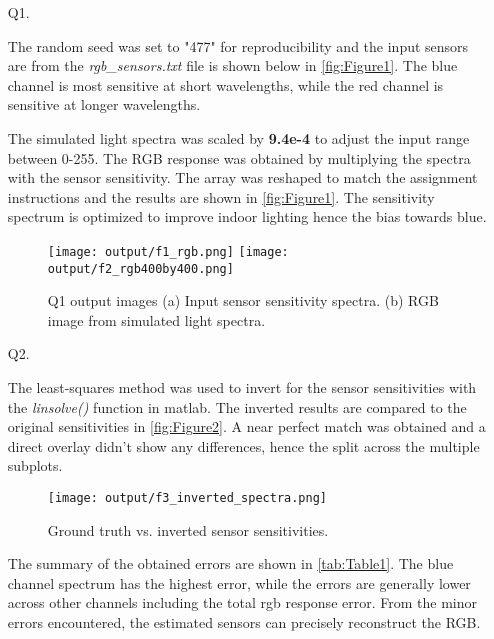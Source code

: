 \documentclass[12pt]{report}
\begin{document}
\begin{enumerate}

    \item[Q1.]

    The random seed was set to "477" for reproducibility and the input sensors are from the \emph{rgb\_sensors.txt} file is shown 
    below in \autoref{fig:Figure1}. The blue channel is most sensitive at short wavelengths, while the red channel is 
    sensitive at longer wavelengths.

    The simulated light spectra was scaled by \textbf{9.4e-4} to adjust the input range between 0-255. The RGB response was obtained 
    by multiplying the spectra with the sensor sensitivity. The array was reshaped to match the assignment instructions and the 
    results are shown in \autoref{fig:Figure1}. The sensitivity spectrum is optimized to improve indoor lighting hence the bias 
    towards blue.

    \begin{figure}[ht!]
        \centering
        \texttt{[image: output/f1\_rgb.png]} \hfill
        \texttt{[image: output/f2\_rgb400by400.png]}
        \caption{Q1 output images (a) Input sensor sensitivity spectra. 
        (b) RGB image from simulated light spectra.}
        \label{fig:Figure1}
    \end{figure}

    \FloatBarrier 

    \item[Q2.]

    The least-squares method was used to invert for the sensor sensitivities with the \emph{linsolve()} function in matlab.
    The inverted results are compared to the original sensitivities in \autoref{fig:Figure2}. A near perfect match was obtained 
    and a direct overlay didn't show any differences, hence the split across the multiple subplots.

    \begin{figure}[ht!]
        \centering
        \texttt{[image: output/f3\_inverted\_spectra.png]}
        \caption{Ground truth vs. inverted sensor sensitivities.}
        \label{fig:Figure2}
    \end{figure}

    \FloatBarrier

    The summary of the obtained errors are shown in \autoref{tab:Table1}. The blue channel spectrum has the highest error, while 
    the errors are generally lower across other channels including the total rgb response error. From the minor errors encountered, 
    the estimated sensors can precisely reconstruct the RGB.


\end{enumerate}
\end{document}
